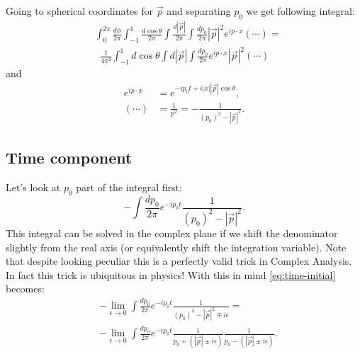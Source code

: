 \documentclass[aps,prd,final,twocolumn,floats,floatfix,nofootinbib,10pt]{revtex4-1}
\begin{document}
Going to spherical coordinates for $\vec{p}$ and separating $p_0$ we get following integral:
\begin{align}\label{eq:expanded-integral}
& \int_0^{2 \pi} \frac{d \phi}{2 \pi} \int_{-1}^{1} \frac{d \cos{\theta}}{2 \pi} \int \frac{d |\vec{p}|}{2 \pi}
  \int \frac{d p_0}{2 \pi} |\vec{p}|^2 e^{i p \cdot x} \left( \cdots \right) = \\
& \; \; \frac{1}{4 \pi^2} \int_{-1}^{1} d \cos{\theta} \int d |\vec{p}|
  \int \frac{d p_0}{2 \pi} e^{i p \cdot x} |\vec{p}|^2 \left( \cdots \right)
\end{align}
and
\begin{align}
e^{i p \cdot x} & = e^{-i p_0 t + i |x| |\vec{p}| \cos{\theta}}, \\
\left( \cdots \right) & = \frac{1}{p^2} = -\frac{1}{(p_0)^2 - |\vec{p}|^2}.
\end{align}

\subsection{Time component}

Let's look at $p_0$ part of the integral first:
\begin{equation}\label{eq:time-initial}
-\int \frac{d p_0}{2 \pi} e^{-i p_0 t} \frac{1}{(p_0)^2 - |\vec{p}|^2}.
\end{equation}
This integral can be solved in the complex plane if we shift the denominator slightly from the real axis (or equivalently shift the integration variable). Note that despite looking peculiar this is a perfectly valid trick in Complex Analysis. In fact this trick is ubiquitous in physics! With this in mind \eqref{eq:time-initial} becomes:
\begin{align}
& -\lim_{\epsilon \to 0} \int \frac{d p_0}{2 \pi} e^{-i p_0 t} \frac{1}{(p_0)^2 - |\vec{p}|^2 \mp i \epsilon} = \\
& -\lim_{\epsilon \to 0} \int \frac{d p_0}{2 \pi} e^{-i p_0 t} \frac{1}{p_0 + \left( |\vec{p}| \pm i \epsilon \right)}
  \frac{1}{p_0 - \left(|\vec{p}| \pm i \epsilon \right)} \label{eq:expanded-time}.
\end{align}
\end{document}
